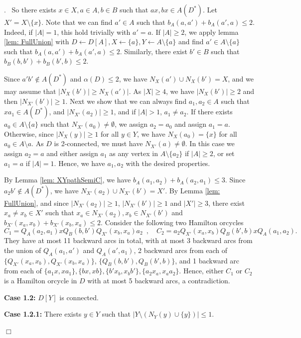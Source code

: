 \documentclass{article}
\newcommand{\2}{\vspace{2mm}}
\renewenvironment{proof}[1][]{\par \noindent {\bf Proof#1}.\ }{\hfill$\Box$
\par \vspace{11pt}}
\theoremstyle{definition}
\begin{document}
\begin{proof}
So there exists $x\in X, a \in A, b \in B$ such that $ax, bx \in A(D^*)$. Let $X'=X \setminus \{x\}$. Note that we can find $a' \in A$ such that $b_A(a,a')+ b_A(a',a)\le 2$. Indeed, if $|A|=1$, this hold trivially with $a'=a$. If $|A| \ge 2$, we apply lemma \ref{lem: FullUnion} with $D \leftarrow D[A], X \leftarrow \{a\}, Y \leftarrow A\setminus\{a\}$ and find $a' \in A \setminus \{a\}$ such that $b_A(a,a')+ b_A(a',a)\le 2$. Similarly, there exist $b' \in B$ such that $b_B(b,b')+ b_B(b',b)\le 2$. 

Since $a'b' \notin A(D^*)$ and $\alpha(D) \le 2$, we have $N_{X}(a') \cup N_{X}(b')= X$, and we may assume that $|N_{X}(b')| \ge N_{X}(a')|$. As $|X| \ge 4$, we have $|N_{X}(b')| \ge 2$ and then $|N_{X'}(b')| \ge 1$. Next we show that we can always find $a_1,a_2 \in A$ such that $xa_1 \in A(D^*)$, and $|N_{X'}(a_2)| \ge 1$, and  if $|A|>1$, $a_1\ne a_2$.
If there exists $a_0 \in A  \setminus \{a\}$ such that $N_{X'}(a_0) \neq \emptyset$, we assign $a_2=a_0$ and assign $a_1=a$. Otherwise, since $|N_X(y)| \ge 1$ for all $y \in Y$, we have $N_{X}(a_0) =\{x\}$ for all $a_0 \in A \setminus a$.
As $D$ is 2-connected, we must have $N_{X'}(a) \neq \emptyset$. In this case we assign $a_2=a$ and either assign $a_1$ as any vertex in $A \setminus \{a_2\}$ if $|A| \ge 2$, or set $a_1=a$ if $|A|=1$. Hence, we have $a_1, a_2$ with the desired properties.

By Lemma \ref{lem: XYpathSemiC}, we have $b_A(a_1,a_2)+ b_A(a_2,a_1)\le 3$.
Since $a_2b' \notin A(D^*)$, we have $N_{X'}(a_2) \cup N_{X'}(b')= X'$. By Lemma \ref{lem: FullUnion}, and since $|N_{X'}(a_2)| \ge 1$, $|N_{X'}(b')| \ge 1$ and $|X'|\ge 3$, there exist $x_a \neq x_b \in X'$ such that $x_a \in N_{X'}(a_2), x_b \in N_{X'}(b')$ and $b_{X'}(x_a,x_b)+ b_{X'}(x_b,x_a)\le 2$.
Consider the following two Hamilton orcycles 
\[
C_1=Q_A(a_2,a_1) x Q_B(b,b') Q_{X'}(x_b,x_a)a_2 \enspace, \quad 
C_2=a_2 Q_{X'}(x_a,x_b)Q_B(b',b) x Q_A(a_1,a_2).  
\]
They have at most 11 backward arcs in total, with at most 3 backward arcs from the union of $Q_A(a_1, a')$ and $Q_A(a', a_1)$,
2 backward arcs from each of $\{Q_{X'}(x_a,x_b), Q_{X'}(x_b,x_a)\}$, $\{Q_B(b,b'), Q_B(b',b)\}$, 
and 1 backward arc from each of $\{a_1x,xa_1\},\{bx,xb\},\{b'x_b,x_b b'\}, \{a_2 x_a, x_a a_2\}$. Hence, either $C_1$ or $C_2$ is a Hamilton orcycle in $D$ with at most 5 backward arcs, a contradiction.

\textbf{Case 1.2:} $D[Y]$ is connected.

\2

\textbf{Case 1.2.1:} There exists $y \in Y$ such that $|Y \setminus (N_Y(y) \cup \{y\})| \le 1$. 


\end{proof}
\end{document}
